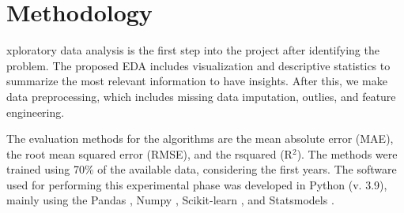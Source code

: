 \section{Methodology}
\label{sec:methodology}

xploratory data analysis is the first step into the project after
identifying the problem. The proposed EDA includes visualization and descriptive statistics to
summarize the most relevant information to have insights. After this, we make
data preprocessing, which includes missing data imputation, outlies, and
feature engineering.   

The evaluation methods for the algorithms are the mean absolute error (MAE), the root
mean squared error (RMSE), and the rsquared (R$^2$). The methods were
trained using 70\% of the available data, considering the first years. The
software used for performing this experimental phase was developed in Python
(v. 3.9), mainly using the Pandas \cite{pandas1,pandas2}, Numpy
\cite{numpy}, Scikit-learn \cite{scikit-learn}, and Statsmodels \cite{statsmodels}. 
